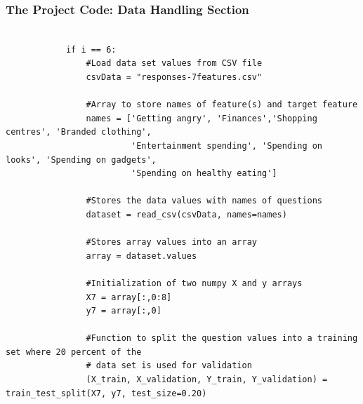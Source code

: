 \documentclass{beamer}
\begin{document}
\begin{frame}[fragile]
\frametitle{The Project Code: Data Handling Section}

\fontsize{6}{5}
\begin{verbatim}

            if i == 6:
                #Load data set values from CSV file
                csvData = "responses-7features.csv"    

                #Array to store names of feature(s) and target feature
                names = ['Getting angry', 'Finances','Shopping centres', 'Branded clothing',
                         'Entertainment spending', 'Spending on looks', 'Spending on gadgets',
                         'Spending on healthy eating']
    
                #Stores the data values with names of questions
                dataset = read_csv(csvData, names=names)

                #Stores array values into an array
                array = dataset.values

                #Initialization of two numpy X and y arrays
                X7 = array[:,0:8]
                y7 = array[:,0]

                #Function to split the question values into a training set where 20 percent of the 
                # data set is used for validation
                (X_train, X_validation, Y_train, Y_validation) = train_test_split(X7, y7, test_size=0.20)


\end{verbatim}
\end{frame}

\end{document}
